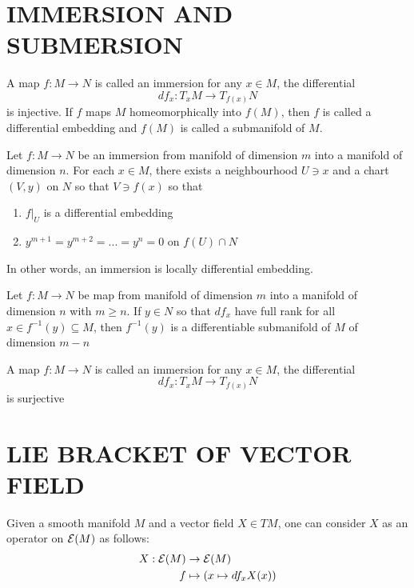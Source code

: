 \section{IMMERSION AND SUBMERSION}

\begin{definition}
	A map $f: M \to N$ is called an immersion for any $x \in M$, the differential
	$$
		df_x: T_x M \to T_{f(x)} N 
	$$
	is injective. If $f$ maps $M$ homeomorphically into $f(M)$, then $f$ is called a differential embedding and $f(M)$ is called a submanifold of $M$.
\end{definition}

\begin{lemma}
	Let $f: M \to N$ be an immersion from manifold of dimension $m$ into a manifold of dimension $n$. For each $x \in M$, there exists a neighbourhood $U \ni x$ and a chart $(V, y)$ on $N$ so that $V \ni f(x)$ so that
	\begin{enumerate}
		\item $f\vert_U$ is a differential embedding
		\item $y^{m+1} = y^{m+2} = ... = y^{n} = 0$ on $f(U) \cap N$
	\end{enumerate}
	
	In other words, an immersion is locally differential embedding.
\end{lemma}

\begin{lemma}
	Let $f: M \to N$ be map from manifold of dimension $m$ into a manifold of dimension $n$ with $m \geq n$. If $y \in N$ so that $df_x$ have full rank for all $x \in f^{-1}(y) \subseteq M$, then $f^{-1}(y)$ is a differentiable submanifold of $M$ of dimension $m-n$
\end{lemma}

\begin{definition}[submersion]
	A map $f: M \to N$ is called an immersion for any $x \in M$, the differential
	$$
	df_x: T_x M \to T_{f(x)} N 
	$$
	is surjective
\end{definition}

\section{LIE BRACKET OF VECTOR FIELD}

\begin{remark}
	Given a smooth manifold $M$ and a vector field $X \in TM$, one can consider $X$ as an operator on $\mathcal{E}(M)$ as follows:
	\begin{align*}
		X: \mathcal{E}(M) &\to \mathcal{E}(M) \\
		f &\mapsto (x \mapsto df_x X(x))
	\end{align*}
\end{remark}

